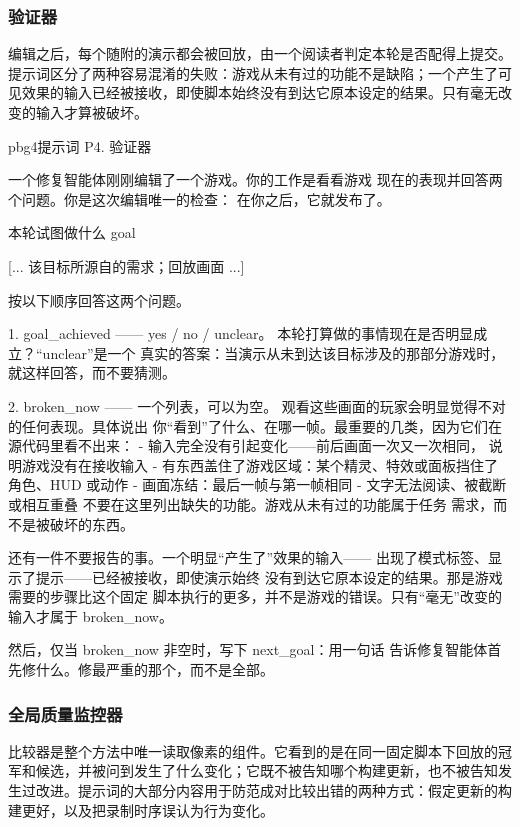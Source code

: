 \subsubsection{验证器}
编辑之后，每个随附的演示都会被回放，由一个阅读者判定本轮是否配得上提交。提示词区分了两种容易混淆的失败：游戏从未有过的功能不是缺陷；一个产生了可见效果的输入已经被接收，即使脚本始终没有到达它原本设定的结果。只有毫无改变的输入才算被破坏。

\begin{promptbox}{pbg4}{提示词 P4. 验证器}
\begin{PV}
一个修复智能体刚刚编辑了一个游戏。你的工作是看看游戏
现在的表现并回答两个问题。你是这次编辑唯一的检查：
在你之后，它就发布了。

本轮试图做什么
{goal}

[... 该目标所源自的需求；回放画面 ...]

按以下顺序回答这两个问题。

1. goal_achieved —— yes / no / unclear。
   本轮打算做的事情现在是否明显成立？“unclear”是一个
   真实的答案：当演示从未到达该目标涉及的那部分游戏时，
   就这样回答，而不要猜测。

2. broken_now —— 一个列表，可以为空。
   观看这些画面的玩家会明显觉得不对的任何表现。具体说出
   你“看到”了什么、在哪一帧。最重要的几类，因为它们在
   源代码里看不出来：
     - 输入完全没有引起变化——前后画面一次又一次相同，
       说明游戏没有在接收输入
     - 有东西盖住了游戏区域：某个精灵、特效或面板挡住了
       角色、HUD 或动作
     - 画面冻结：最后一帧与第一帧相同
     - 文字无法阅读、被截断或相互重叠
   不要在这里列出缺失的功能。游戏从未有过的功能属于任务
   需求，而不是被破坏的东西。

还有一件不要报告的事。一个明显“产生了”效果的输入——
出现了模式标签、显示了提示——已经被接收，即使演示始终
没有到达它原本设定的结果。那是游戏需要的步骤比这个固定
脚本执行的更多，并不是游戏的错误。只有“毫无”改变的
输入才属于 broken_now。

然后，仅当 broken_now 非空时，写下 next_goal：用一句话
告诉修复智能体首先修什么。修最严重的那个，而不是全部。
\end{PV}
\end{promptbox}

\subsubsection{全局质量监控器}
比较器是整个方法中唯一读取像素的组件。它看到的是在同一固定脚本下回放的冠军和候选，并被问到发生了什么变化；它既不被告知哪个构建更新，也不被告知发生过改进。提示词的大部分内容用于防范成对比较出错的两种方式：假定更新的构建更好，以及把录制时序误认为行为变化。


